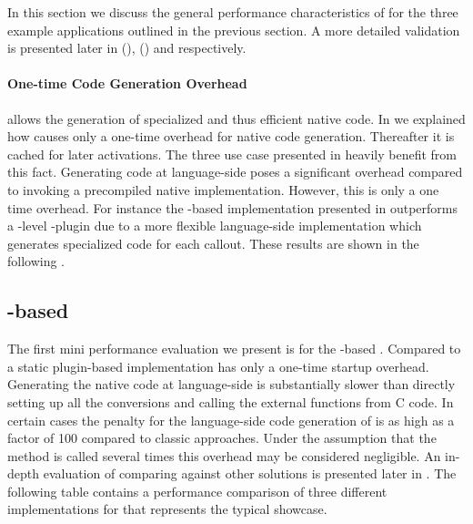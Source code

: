In this section we discuss the general performance characteristics of \B for the three example applications outlined in the previous section.
A more detailed validation is presented later in  (\FFI),  (\WF) and  respectively.

\paragraph{One-time Code Generation Overhead} 
\B allows the generation of specialized and thus efficient native code.
In  we explained how \B causes only a one-time overhead for native code generation. 
Thereafter it is cached for later activations.
The three use case presented in  heavily benefit from this fact.
Generating code at language-side poses a significant overhead compared to invoking a precompiled native implementation.
However, this is only a one time overhead.
For instance the \B-based \FFI implementation presented in  outperforms a \VM-level \FFI-plugin due to a more flexible language-side implementation which generates specialized code for each \FFI callout. 
These results are shown in the following .

\subsection{\B-based \FFI}

The first mini performance evaluation we present is for \NB the \B-based \FFI.
Compared to a static plugin-based \FFI implementation \NB has only a one-time startup overhead.
Generating the native code at language-side is substantially slower than directly setting up all the conversions and calling the external functions from C code. 
In certain cases the penalty for the language-side code generation of \NB is as high as a factor of 100 compared to classic approaches.
Under the assumption that the method is called several times this overhead may be considered negligible.
An in-depth evaluation of \NB comparing against other solutions is presented later in .
The following table contains a performance comparison of three different \FFI implementations for \PH that represents the typical showcase.

